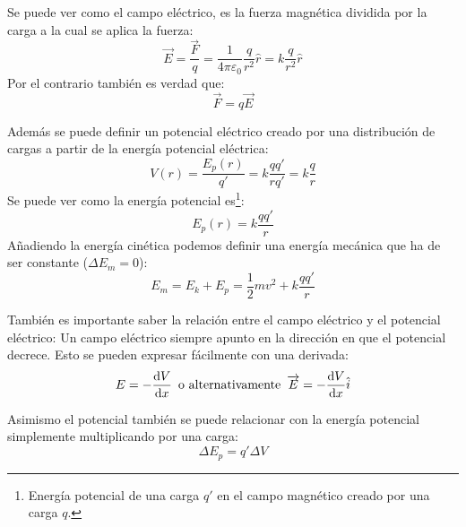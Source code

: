 \documentclass[arial,a4paper,print]{article}
\begin{document}
Se puede ver como el campo eléctrico, es la fuerza magnética dividida por la carga a la cual se aplica la fuerza:
\begin{equation*}
	\overrightarrow{E} = \frac{\overrightarrow{F}}{q} = \frac{1}{4\pi\varepsilon_{0}} \frac{q}{r^{2}}\hat{r} = k\frac{q}{r^2}\hat{r}
\end{equation*}
Por el contrario también es verdad que:
\begin{equation*}
	\overrightarrow{F} = q\overrightarrow{E}
\end{equation*}

Además se puede definir un potencial eléctrico creado por una distribución de cargas a partir de la energía potencial eléctrica:
\begin{equation*}
	V(r) = \frac{E_{p}(r)}{q'} = k\frac{qq'}{rq'} = k\frac{q}{r}
\end{equation*} 
Se puede ver como la energía potencial es\footnote{Energía potencial de una carga $q'$ en el campo magnético creado por una carga $q$.}:
\begin{equation*}
	E_{p}(r)=k\frac{qq'}{r}
\end{equation*}
Añadiendo la energía cinética podemos definir una energía mecánica que ha de ser constante ($\Delta E_{m} = 0$):
\begin{equation*}
	E_{m} = E_{k} + E_{p} = \frac12 mv^{2} + k\frac{qq'}{r}
\end{equation*}

También es importante saber la relación entre el campo eléctrico y el potencial eléctrico: Un campo eléctrico siempre apunto en la dirección en que el potencial decrece. Esto se pueden expresar fácilmente con una derivada:
\begin{equation*}
	E = -\dv{V}{x}\,\text{ o alternativamente }\, \overrightarrow{E} = -\dv{V}{x}\hat{i}
\end{equation*}

Asimismo el potencial también se puede relacionar con la energía potencial simplemente multiplicando por una carga:
\begin{equation*}
	\Delta E_{p} = q'\Delta V
\end{equation*}

\pagebreak
\end{document}
